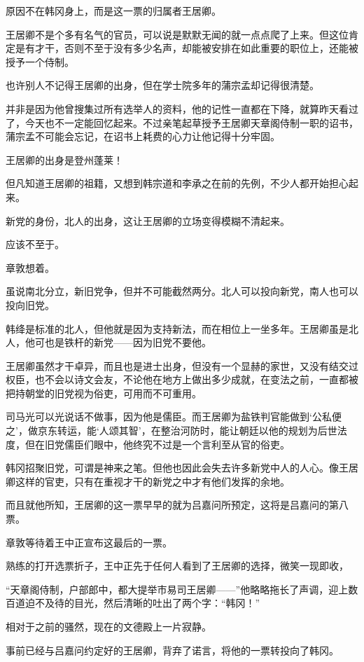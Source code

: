 原因不在韩冈身上，而是这一票的归属者王居卿。

王居卿不是个多有名气的官员，可以说是默默无闻的就一点点爬了上来。但这位肯定是有才干，否则不至于没有多少名声，却能被安排在如此重要的职位上，还能被授予一个侍制。

也许别人不记得王居卿的出身，但在学士院多年的蒲宗孟却记得很清楚。

并非是因为他曾搜集过所有选举人的资料，他的记性一直都在下降，就算昨天看过了，今天也不一定能回忆起来。不过亲笔起草授予王居卿天章阁侍制一职的诏书，蒲宗孟不可能会忘记，在诏书上耗费的心力让他记得十分牢固。

王居卿的出身是登州蓬莱！

但凡知道王居卿的祖籍，又想到韩宗道和李承之在前的先例，不少人都开始担心起来。

新党的身份，北人的出身，这让王居卿的立场变得模糊不清起来。

应该不至于。

章敦想着。

虽说南北分立，新旧党争，但并不可能截然两分。北人可以投向新党，南人也可以投向旧党。

韩绛是标准的北人，但他就是因为支持新法，而在相位上一坐多年。王居卿虽是北人，他可也是铁杆的新党——因为旧党不要他。

王居卿虽然才干卓异，而且也是进士出身，但没有一个显赫的家世，又没有结交过权臣，也不会以诗文会友，不论他在地方上做出多少成就，在变法之前，一直都被把持朝堂的旧党视为俗吏，可用而不可重用。

司马光可以光说话不做事，因为他是儒臣。而王居卿为盐铁判官能做到‘公私便之’，做京东转运，能‘人颂其智’，在整治河防时，能让朝廷以他的规划为后世法度，但在旧党儒臣们眼中，他终究不过是一个言利至从官的俗吏。

韩冈招聚旧党，可谓是神来之笔。但他也因此会失去许多新党中人的人心。像王居卿这样的官吏，只有在重视才干的新党之中才有他们发挥的余地。

而且就他所知，王居卿的这一票早早的就为吕嘉问所预定，这将是吕嘉问的第八票。

章敦等待着王中正宣布这最后的一票。

熟练的打开选票折子，王中正先于任何人看到了王居卿的选择，微笑一现即收，

“天章阁侍制，户部郎中，都大提举市易司王居卿——”他略略拖长了声调，迎上数百道迫不及待的目光，然后清晰的吐出了两个字：“韩冈！”

相对于之前的骚然，现在的文德殿上一片寂静。

事前已经与吕嘉问约定好的王居卿，背弃了诺言，将他的一票转投向了韩冈。


